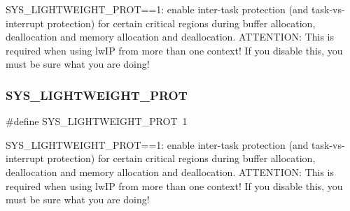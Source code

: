 S\+Y\+S\+\_\+\+L\+I\+G\+H\+T\+W\+E\+I\+G\+H\+T\+\_\+\+P\+R\+OT==1\+: enable inter-\/task protection (and task-\/vs-\/interrupt protection) for certain critical regions during buffer allocation, deallocation and memory allocation and deallocation. A\+T\+T\+E\+N\+T\+I\+ON\+: This is required when using lw\+IP from more than one context! If you disable this, you must be sure what you are doing! \mbox{\label{group__lwip__opts__lock_gae85efb3a5fcf8585c94b3c2669978959}} 
\subsubsection{\texorpdfstring{S\+Y\+S\+\_\+\+L\+I\+G\+H\+T\+W\+E\+I\+G\+H\+T\+\_\+\+P\+R\+OT}{SYS\_LIGHTWEIGHT\_PROT}\hspace{0.1cm}{\footnotesize\ttfamily [2/2]}}
{\footnotesize\ttfamily \#define S\+Y\+S\+\_\+\+L\+I\+G\+H\+T\+W\+E\+I\+G\+H\+T\+\_\+\+P\+R\+OT~1}

S\+Y\+S\+\_\+\+L\+I\+G\+H\+T\+W\+E\+I\+G\+H\+T\+\_\+\+P\+R\+OT==1\+: enable inter-\/task protection (and task-\/vs-\/interrupt protection) for certain critical regions during buffer allocation, deallocation and memory allocation and deallocation. A\+T\+T\+E\+N\+T\+I\+ON\+: This is required when using lw\+IP from more than one context! If you disable this, you must be sure what you are doing! 